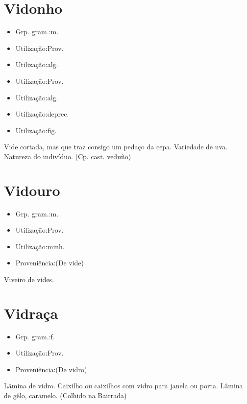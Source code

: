 \documentclass{article}
\begin{document}
\section{Vidonho}
\begin{itemize}
\item {Grp. gram.:m.}
\end{itemize}
\begin{itemize}
\item {Utilização:Prov.}
\end{itemize}
\begin{itemize}
\item {Utilização:alg.}
\end{itemize}
\begin{itemize}
\item {Utilização:Prov.}
\end{itemize}
\begin{itemize}
\item {Utilização:alg.}
\end{itemize}
\begin{itemize}
\item {Utilização:deprec.}
\end{itemize}
\begin{itemize}
\item {Utilização:fig.}
\end{itemize}
Vide cortada, mas que traz consigo um pedaço da cepa.
Variedade de uva.
Natureza do indivíduo.
(Cp. cast. \textunderscore veduño\textunderscore )
\section{Vidouro}
\begin{itemize}
\item {Grp. gram.:m.}
\end{itemize}
\begin{itemize}
\item {Utilização:Prov.}
\end{itemize}
\begin{itemize}
\item {Utilização:minh.}
\end{itemize}
\begin{itemize}
\item {Proveniência:(De \textunderscore vide\textunderscore )}
\end{itemize}
Viveiro de vides.
\section{Vidraça}
\begin{itemize}
\item {Grp. gram.:f.}
\end{itemize}
\begin{itemize}
\item {Utilização:Prov.}
\end{itemize}
\begin{itemize}
\item {Proveniência:(De \textunderscore vidro\textunderscore )}
\end{itemize}
Lâmina de vidro.
Caixilho ou caixilhos com vidro para janela ou porta.
Lâmina de gêlo, caramelo. (Colhido na Bairrada)
\end{document}
